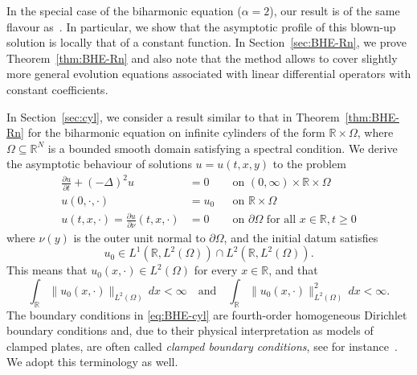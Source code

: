 \documentclass[a4paper, reqno]{amsart}
\numberwithin{equation}{section}
\theoremstyle{plain}
\theoremstyle{definition}
\theoremstyle{remark}
\newcommand{\RR}{\mathbb{R}}
\begin{document}
In the special case of the biharmonic equation ($\alpha=2$), our result is of the same flavour as~\cite[Theorem 1.1]{FGG}. In particular, we show that the asymptotic profile of this blown-up solution is locally that of a constant function. In Section~\ref{sec:BHE-Rn}, we prove Theorem~\ref{thm:BHE-Rn} and also note that the method allows to cover slightly more general evolution equations associated with linear differential operators with constant coefficients.

In Section~\ref{sec:cyl}, we consider a result similar to that in Theorem~\ref{thm:BHE-Rn} for the biharmonic equation on infinite cylinders of the form $\RR \times \Omega$, where $\Omega \subseteq \RR^N$ is a bounded smooth domain satisfying a spectral condition. We derive the asymptotic behaviour of solutions $u = u(t,x,y)$ to the problem
\begin{equation}
  \label{eq:BHE-cyl}
  \begin{aligned}
    \frac{\partial u}{\partial t} + (-\Delta)^2 u            & = 0   &  & \text{on } (0, \infty) \times \RR \times \Omega                \\
    u(0, \cdot, \cdot)                                       & = u_0 &  & \text{on } \RR \times \Omega                                   \\
    u(t,x,\cdot) =\frac{\partial u}{\partial \nu}(t,x,\cdot) & = 0   &  & \text{on } \partial\Omega \text{ for all } x \in \RR, t \geq 0
  \end{aligned}
\end{equation}
where $\nu(y)$ is the outer unit normal to $\partial\Omega$, and the initial datum satisfies
\begin{equation}
  \label{eq:BHE-cyl-u0}
  u_0 \in L^1(\RR, L^2(\Omega)) \cap L^2 (\RR, L^2(\Omega)).
\end{equation}
This means that $u_0(x, \cdot) \in L^2(\Omega)$ for every $x \in \RR$, and that
\begin{equation*}
  \int_\RR \| u_0(x,\cdot) \|_{L^2(\Omega)} \,dx < \infty \quad \text{and} \quad \int_\RR \| u_0(x,\cdot) \|^2_{L^2(\Omega)} \,dx < \infty.
\end{equation*}
The boundary conditions in \eqref{eq:BHE-cyl} are fourth-order homogeneous Dirichlet boundary conditions and, due to their physical interpretation as models of clamped plates, are often called \emph{clamped boundary conditions}, see for instance~\cite[Section 1.1.2]{GGS}. We adopt this terminology as well.
\end{document}
